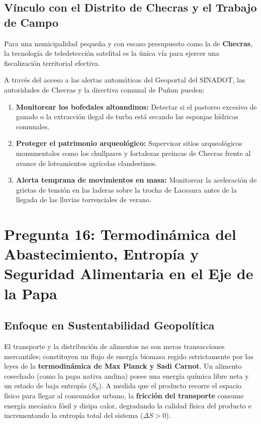 \documentclass[11pt,a4paper]{article}
\begin{document}
\subsection{Vínculo con el Distrito de Checras y el Trabajo de Campo}
Para una municipalidad pequeña y con escaso presupuesto como la de \textbf{Checras}, la tecnología de teledetección satelital es la única vía para ejercer una fiscalización territorial efectiva. 

A través del acceso a las alertas automáticas del Geoportal del SINADOT, las autoridades de Checras y la directiva comunal de Puñun pueden:
\begin{enumerate}
    \item \textbf{Monitorear los bofedales altoandinos:} Detectar si el pastoreo excesivo de ganado o la extracción ilegal de turba está secando las esponjas hídricas comunales.
    \item \textbf{Proteger el patrimonio arqueológico:} Supervisar sitios arqueológicos monumentales como los chullpares y fortalezas preincas de Checras frente al avance de loteamientos agrícolas clandestinos.
    \item \textbf{Alerta temprana de movimientos en masa:} Monitorear la aceleración de grietas de tensión en las laderas sobre la trocha de Lacsaura antes de la llegada de las lluvias torrenciales de verano.
\end{enumerate}


\newpage

\section{Pregunta 16: Termodinámica del Abastecimiento, Entropía y Seguridad Alimentaria en el Eje de la Papa}

\subsection{Enfoque en Sustentabilidad Geopolítica}
El transporte y la distribución de alimentos no son meras transacciones mercantiles; constituyen un flujo de energía biomasa regido estrictamente por las leyes de la \textbf{termodinámica de Max Planck y Sadi Carnot}. Un alimento cosechado (como la papa nativa andina) posee una energía química libre neta y un estado de baja entropía ($S_0$). A medida que el producto recorre el espacio físico para llegar al consumidor urbano, la \textbf{fricción del transporte} consume energía mecánica fósil y disipa calor, degradando la calidad física del producto e incrementando la entropía total del sistema ($\Delta S > 0$).
\end{document}
